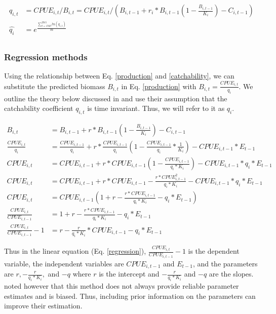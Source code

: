 \documentclass[oneside,12pt,final]{sty/ucthesis-CA2012}
\begin{document}
\begin{mainmatter}
\begin{align*}
q_{i,t} &= CPUE_{i,t}/B_{i,t}  = CPUE_{i,t}/\left(B_{i,t-1} + r_i*B_{i,t-1} \left( 1- \frac{B_{i,t-1}}{K_i} \right)-C_{i,t-1} \right) \\
\widehat{q_{i}} &= e^{\frac{\sum_{t=1949}^{2015} ln(q_{i,t})}{m}}  \\
\end{align*}

\subsubsection*{Regression methods}
Using the relationship between Eq. \ref{production} and \ref{catchability}, we can substitute the predicted biomass $B_{i,t}$ in Eq. \ref{production} with $B_{i,t}=\frac{CPUE_{i,t}}{q_i} $. We outline the theory below discussed in \citet{hilborn1992quantitative} and use their assumption that the catchability coefficient $q_{i,t}$ is time invariant. Thus, we will refer to it as $q_i$.

\begin{align*}
B_{i,t} &= B_{i,t-1} + r*B_{i,t-1} \left(1- \frac{B_{i,t-1}}{K_i} \right)-C_{i,t-1} \\
\frac{CPUE_{i,t}}{q_i} &= \frac{CPUE_{i,t-1}}{q_i}  + r*\frac{CPUE_{i,t-1}}{q_i} \left(1-\frac{CPUE_{i,t-1}}{q_i}*\frac{1}{K_i} \right) - CPUE_{i,t-1}*E_{t-1} \\
CPUE_{i,t} &= CPUE_{i,t-1} + r*CPUE_{i,t-1} \left(1-\frac{CPUE_{i,t-1}}{q_i*K_i} \right) - CPUE_{i,t-1}*q_i*E_{t-1} \\
CPUE_{i,t} &= CPUE_{i,t-1} + r*CPUE_{i,t-1} -\frac{r*CPUE_{i,t-1}^2}{q_i*K_i}  - CPUE_{i,t-1}*q_i*E_{t-1} \\
CPUE_{i,t} &= CPUE_{i,t-1} \left(1 + r -\frac{r*CPUE_{i,t-1}}{q_i*K_i}  - q_i*E_{t-1} \right) \\
\frac{CPUE_{i,t}}{CPUE_{i,t-1} } &= 1 + r -\frac{r*CPUE_{i,t-1}}{q_i*K_i}  - q_i*E_{t-1} \\
\frac{CPUE_{i,t}}{CPUE_{i,t-1} } -1 &= r -\frac{r}{q_i*K_i}*CPUE_{i,t-1}  - q_i*E_{t-1} 
\end{align*}

Thus in the linear equation (Eq. \ref{regression}), $\frac{CPUE_{i,t}}{CPUE_{i,t-1} } -1$ is the dependent variable, the independent variables are $CPUE_{i,t-1} $ and $E_{t-1} $, and the parameters are $r, -\frac{r}{q_i*K_i},$ and $-q$ where $r$ is the intercept and $-\frac{r}{q_i*K_i}$ and $-q$ are the slopes. \citet{hilborn1992quantitative} noted however that this method does not always provide reliable parameter estimates and is biased. Thus, including prior information on the parameters can improve their estimation.


\end{mainmatter}
\end{document}

